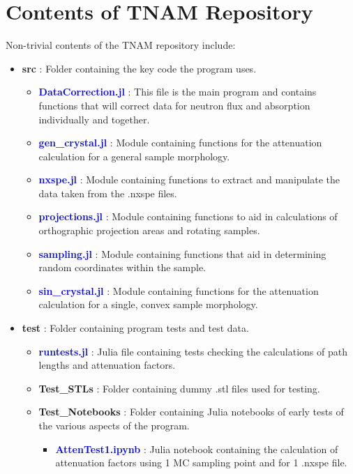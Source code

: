 \documentclass{article}
\begin{document}
\section{Contents of TNAM Repository}
Non-trivial contents of the TNAM repository include:
\begin{itemize}
    \item \textbf{src} : Folder containing the key code the program uses.
    \begin{itemize}
        \item \textcolor{blue}{\textbf{DataCorrection.jl}} : This file is the main program and contains functions that will correct data for neutron flux and absorption individually and together.
        \item \textcolor{blue}{\textbf{gen\_crystal.jl}} : Module containing functions for the attenuation calculation for a general sample morphology.
        \item \textcolor{blue}{\textbf{nxspe.jl}} : Module containing functions to extract and manipulate the data taken from the .nxspe files.
        \item \textcolor{blue}{\textbf{projections.jl}} : Module containing functions to aid in calculations of orthographic projection areas and rotating samples.
        \item \textcolor{blue}{\textbf{sampling.jl}} : Module containing functions that aid in determining random coordinates within the sample.
        \item \textcolor{blue}{\textbf{sin\_crystal.jl}} : Module containing functions for the attenuation calculation for a single, convex sample morphology.
    \end{itemize}
    \item \textbf{test} : Folder containing program tests and test data.
    \begin{itemize}
        \item \textcolor{blue}{\textbf{runtests.jl}} : Julia file containing tests checking the calculations of path lengths and attenuation factors.
        \item \textbf{Test\_STLs} : Folder containing dummy .stl files used for testing.
        \item \textbf{Test\_Notebooks} : Folder containing Julia notebooks of early tests of the various aspects of the program.
        \begin{itemize}
            \item \textcolor{blue}{\textbf{AttenTest1.ipynb}} : Julia notebook containing the calculation of attenuation factors using 1 MC sampling point and for 1 .nxspe file.

\end{itemize}
\end{itemize}
\end{itemize}
\end{document}
